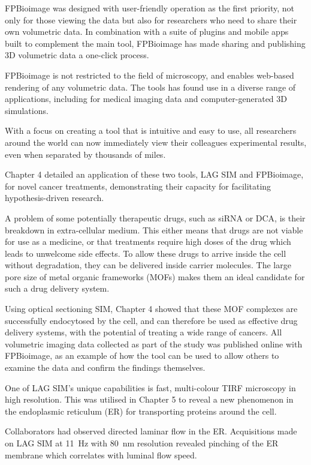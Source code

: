 FPBioimage was designed with user-friendly operation as the first priority, not only for those viewing the data but also for researchers who need to share their own volumetric data. 
In combination with a suite of plugins and mobile apps built to complement the main tool, FPBioimage has made sharing and publishing 3D volumetric data a one-click process.  

FPBioimage is not restricted to the field of microscopy, and enables 
web-based rendering of any volumetric data. 
The tools has found use in a diverse range of applications, including for medical imaging data and computer-generated 3D simulations. 

With a focus on creating a tool that is intuitive and easy to use, all researchers around the world can now immediately view their colleagues experimental results, even when separated by thousands of miles. 

Chapter 4 detailed an application of these two tools, LAG SIM and FPBioimage, for novel cancer treatments, demonstrating their capacity for facilitating hypothesis-driven research. 

A problem of some potentially therapeutic drugs, such as siRNA or DCA, is their breakdown in extra-cellular medium. 
This either means that drugs are not viable for use as a medicine, or that treatments require high doses of the drug which leads to unwelcome side effects. 
To allow these drugs to arrive inside the cell without degradation, they can be delivered inside carrier molecules. 
The large pore size of metal organic frameworks (MOFs) makes them an ideal candidate for such a drug delivery system. 

Using optical sectioning SIM, Chapter 4 showed that these MOF complexes are successfully endocytosed by the cell, and can therefore be used as effective drug delivery systems, with the potential of treating a wide range of cancers. 
All volumetric imaging data collected as part of the study was published online with FPBioimage, as an example of how the tool can be used to allow others to examine the data and confirm the findings themselves. 

One of LAG SIM's unique capabilities is fast, multi-colour TIRF microscopy in high resolution. 
This was utilised in Chapter 5 to reveal a new phenomenon in the endoplasmic reticulum (ER) for transporting proteins around the cell. 

Collaborators had observed directed laminar flow in the ER.
Acquisitions made on LAG SIM at \SI{11}{\hertz} with \SI{80}{\nano\metre} resolution revealed pinching of the ER membrane which correlates with luminal flow speed. 

